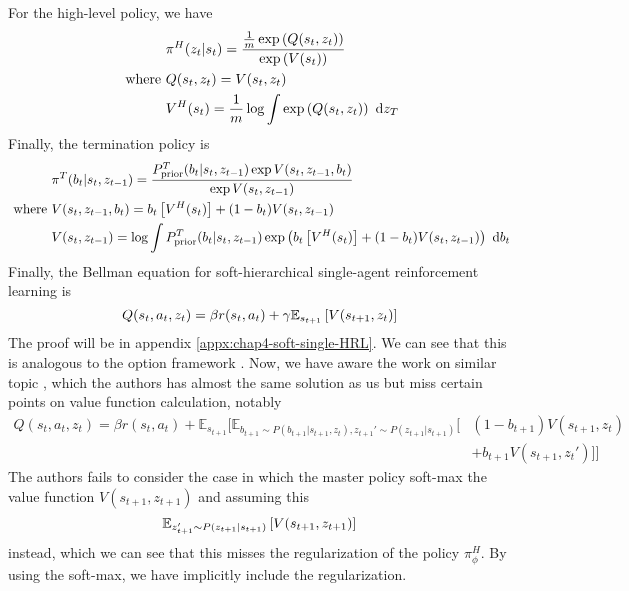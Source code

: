 For the high-level policy, we have 
\begin{equation}
\begin{aligned}
\label{eqn:chap4-single-HRL-higher}
    &\pi^H(z_t | s_t) = \frac{\frac{1}{m}\exp\left( Q(s_t, z_t) \right)}{\exp\left( V(s_t) \right)}
    \\
    \text{ where } &Q(s_t, z_t) =  V(s_t, z_t)  \\
    &V^H(s_t) =  \frac{1}{m}\log \int \exp\left( Q(s_t, z_t) \right) \ \mathrm{d} z_T
\end{aligned} 
\end{equation}
Finally, the termination policy is  
\begin{equation}
\begin{aligned}
\label{eqn:chap4-single-HRL-termination}
    &\pi^T(b_{t} | s_{t}, z_{t-1}) = \frac{P_{\text{prior}}^T(b_{t} | s_{t}, z_{t-1})\exp{V(s_{t}, z_{t-1}, b_{t})}}{\exp V(s_{t}, z_{t-1})} \\
    \text{ where }& V(s_{t}, z_{t-1}, b_{t}) = b_{t} \left[ V^H(s_{t}) \right] + (1-b_{t})V(s_{t}, z_{t-1}) \\
    & V(s_{t}, z_{t-1}) = \log \int P_{\text{prior}}^T(b_{t} | s_{t}, z_{t-1})\exp\left( b_{t} \left[ V^H(s_{t}) \right] + (1-b_{t})V(s_{t}, z_{t-1}) \right) \ \mathrm{d} b_{t}
\end{aligned}
\end{equation}
Finally, the Bellman equation for soft-hierarchical single-agent reinforcement learning is 
\begin{equation}
\label{eqn:chap4-single-HRL-bellman}
    Q(s_t, a_t, z_t) = \beta r(s_t, a_t) + \gamma\mathbb{E}_{s_{t+1}}\left[ V(s_{t+1}, z_t) \right]
\end{equation}
The proof will be in appendix \ref{appx:chap4-soft-single-HRL}. We can see that this is analogous to the option framework \cite{sutton1999between, bacon2017option}. Now, we have aware the work on similar topic \cite{lobo2019soft}, which the authors has almost the same solution as us but miss certain points on value function calculation, notably 
\begin{equation}
\begin{aligned}
Q(s_t, a_t, z_t) = \beta r(s_t, a_t) + \mathbb{E}_{s_{t+1}}\Big[\mathbb{E}_{b_{t+1} \sim P(b_{t+1} | s_{t+1}, z_t), z_{t+1}' \sim P(z_{t+1} | s_{t+1})}\Big[&(1-b_{t+1})V(s_{t+1 }, z_t)  \\
&+ b_{t+1}V(s_{t+1 }, z_t')\Big]\Big]
\end{aligned}
\end{equation}
The authors fails to consider the case in which the master policy soft-max the value function $V(s_{t+1}, z_{t+1})$ and assuming this 
\begin{equation}
    \mathbb{E}_{z_{t+1}' \sim P(z_{t+1} | s_{t+1})}\left[ V(s_{t+1}, z_{t+1}) \right]
\end{equation}
instead, which we can see that this misses the regularization of the policy $\pi^H_\phi$. By using the soft-max, we have implicitly include the regularization. 